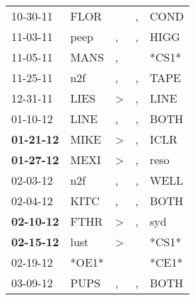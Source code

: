 \begin{supertabular}{p{0.07\textwidth}p{0.06\textwidth}p{0.02\textwidth}p{0.02\textwidth}p{0.06\textwidth}}
          10-30-11\textsuperscript{} &           FLOR\textsuperscript{} &                  &                , &           COND\textsuperscript{} \\
          11-03-11\textsuperscript{} &           peep\textsuperscript{} &                , &                , &           HIGG\textsuperscript{} \\
          11-05-11\textsuperscript{} &           MANS\textsuperscript{} &                , &                  &                            *CS1* \\
          11-25-11\textsuperscript{} &            n2f\textsuperscript{} &                , &                , &           TAPE\textsuperscript{} \\
          12-31-11\textsuperscript{} &           LIES\textsuperscript{} &     \textgreater &                , &           LINE\textsuperscript{} \\
          01-10-12\textsuperscript{} &           LINE\textsuperscript{} &                , &                , &           BOTH\textsuperscript{} \\
 \textbf{01-21-12\textsuperscript{}} &           MIKE\textsuperscript{} &     \textgreater &                , &           ICLR\textsuperscript{} \\
 \textbf{01-27-12\textsuperscript{}} &           MEXI\textsuperscript{} &     \textgreater &                , &           reso\textsuperscript{} \\
          02-03-12\textsuperscript{} &            n2f\textsuperscript{} &                , &                , &           WELL\textsuperscript{} \\
          02-04-12\textsuperscript{} &           KITC\textsuperscript{} &                , &                , &           BOTH\textsuperscript{} \\
 \textbf{02-10-12\textsuperscript{}} &           FTHR\textsuperscript{} &     \textgreater &                , &            syd\textsuperscript{} \\
 \textbf{02-15-12\textsuperscript{}} &           lust\textsuperscript{} &     \textgreater &                  &                            *CS1* \\
          02-19-12\textsuperscript{} &                            *OE1* &                  &                  &                            *CE1* \\
          03-09-12\textsuperscript{} &           PUPS\textsuperscript{} &                , &                , &           BOTH\textsuperscript{} \\

\end{supertabular}
